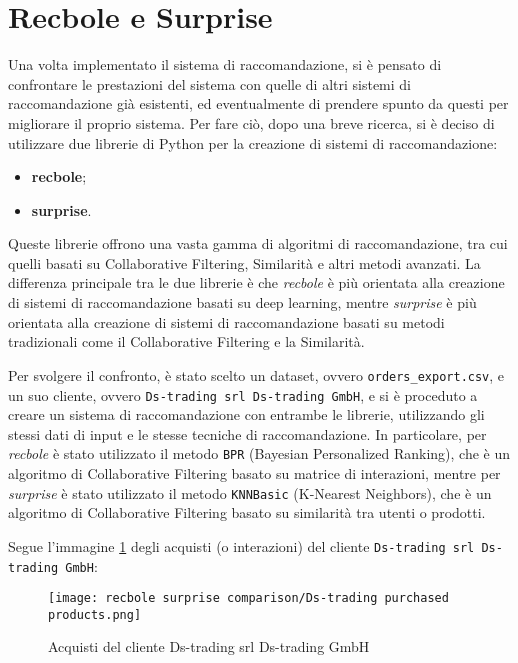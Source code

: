 \section{Recbole e Surprise}

Una volta implementato il sistema di raccomandazione, si è pensato di confrontare le prestazioni del sistema con quelle di altri sistemi di raccomandazione già esistenti, ed eventualmente di prendere spunto da questi per migliorare il proprio sistema.
Per fare ciò, dopo una breve ricerca, si è deciso di utilizzare due librerie di Python per la creazione di sistemi di raccomandazione:
\begin{itemize}
    \item \textbf{\gls{recbole}};
    \item \textbf{\gls{surprise}}.
\end{itemize}

Queste librerie offrono una vasta gamma di algoritmi di raccomandazione, tra cui quelli basati su Collaborative Filtering, Similarità e altri metodi avanzati. La differenza principale tra le due librerie è che \emph{recbole} è più orientata alla creazione di sistemi di raccomandazione basati su deep learning, mentre \emph{surprise} è più orientata alla creazione di sistemi di raccomandazione basati su metodi tradizionali come il Collaborative Filtering e la Similarità.

Per svolgere il confronto, è stato scelto un dataset, ovvero \texttt{orders_export.csv}, e un suo cliente, ovvero \texttt{Ds-trading srl Ds-trading GmbH}, e si è proceduto a creare un sistema di raccomandazione con entrambe le librerie, utilizzando gli stessi dati di input e le stesse tecniche di raccomandazione. In particolare, per \emph{recbole} è stato utilizzato il metodo \texttt{BPR} (Bayesian Personalized Ranking), che è un algoritmo di Collaborative Filtering basato su matrice di interazioni, mentre per \emph{surprise} è stato utilizzato il metodo \texttt{KNNBasic} (K-Nearest Neighbors), che è un algoritmo di Collaborative Filtering basato su similarità tra utenti o prodotti.

Segue l'immagine \ref{fig:recbole-surprise-orders-export} degli acquisti (o interazioni) del cliente \texttt{Ds-trading srl Ds-trading GmbH}:

\begin{figure}[h]
    \centering
    \texttt{[image: recbole surprise comparison/Ds-trading purchased products.png]}
    \caption{Acquisti del cliente Ds-trading srl Ds-trading GmbH}
    \label{fig:recbole-surprise-orders-export}
\end{figure}

